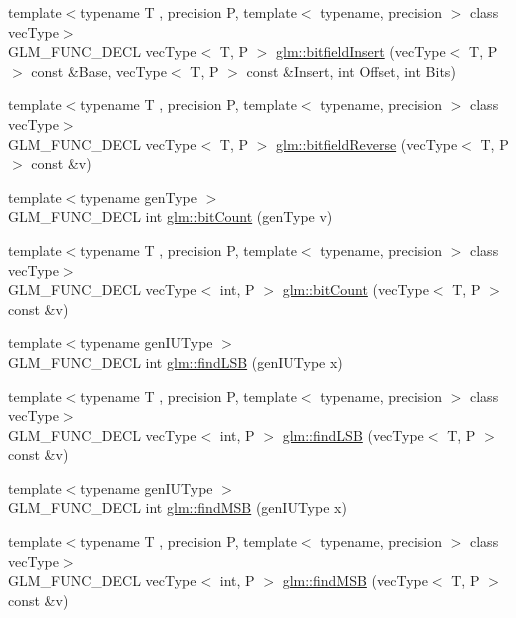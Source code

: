 \begin{DoxyCompactItemize}
\item 
{\footnotesize template$<$typename T , precision P, template$<$ typename, precision $>$ class vec\-Type$>$ }\\G\-L\-M\-\_\-\-F\-U\-N\-C\-\_\-\-D\-E\-C\-L vec\-Type$<$ T, P $>$ \hyperlink{group__core__func__integer_ga5681dfac9239beb1b8bd995e3c6496d7}{glm\-::bitfield\-Insert} (vec\-Type$<$ T, P $>$ const \&Base, vec\-Type$<$ T, P $>$ const \&Insert, int Offset, int Bits)
\item 
{\footnotesize template$<$typename T , precision P, template$<$ typename, precision $>$ class vec\-Type$>$ }\\G\-L\-M\-\_\-\-F\-U\-N\-C\-\_\-\-D\-E\-C\-L vec\-Type$<$ T, P $>$ \hyperlink{group__core__func__integer_ga153e7e8d0c035f83cce50fc3e580930f}{glm\-::bitfield\-Reverse} (vec\-Type$<$ T, P $>$ const \&v)
\item 
{\footnotesize template$<$typename gen\-Type $>$ }\\G\-L\-M\-\_\-\-F\-U\-N\-C\-\_\-\-D\-E\-C\-L int \hyperlink{group__core__func__integer_ga44abfe3379e11cbd29425a843420d0d6}{glm\-::bit\-Count} (gen\-Type v)
\item 
{\footnotesize template$<$typename T , precision P, template$<$ typename, precision $>$ class vec\-Type$>$ }\\G\-L\-M\-\_\-\-F\-U\-N\-C\-\_\-\-D\-E\-C\-L vec\-Type$<$ int, P $>$ \hyperlink{group__core__func__integer_ga1f29640969a3c54564da06ac67a5392e}{glm\-::bit\-Count} (vec\-Type$<$ T, P $>$ const \&v)
\item 
{\footnotesize template$<$typename gen\-I\-U\-Type $>$ }\\G\-L\-M\-\_\-\-F\-U\-N\-C\-\_\-\-D\-E\-C\-L int \hyperlink{group__core__func__integer_gaf74c4d969fa34ab8acb9d390f5ca5274}{glm\-::find\-L\-S\-B} (gen\-I\-U\-Type x)
\item 
{\footnotesize template$<$typename T , precision P, template$<$ typename, precision $>$ class vec\-Type$>$ }\\G\-L\-M\-\_\-\-F\-U\-N\-C\-\_\-\-D\-E\-C\-L vec\-Type$<$ int, P $>$ \hyperlink{group__core__func__integer_ga014a72009e68233c34c06a6dc2251b8c}{glm\-::find\-L\-S\-B} (vec\-Type$<$ T, P $>$ const \&v)
\item 
{\footnotesize template$<$typename gen\-I\-U\-Type $>$ }\\G\-L\-M\-\_\-\-F\-U\-N\-C\-\_\-\-D\-E\-C\-L int \hyperlink{group__core__func__integer_ga7e4a794d766861c70bc961630f8ef621}{glm\-::find\-M\-S\-B} (gen\-I\-U\-Type x)
\item 
{\footnotesize template$<$typename T , precision P, template$<$ typename, precision $>$ class vec\-Type$>$ }\\G\-L\-M\-\_\-\-F\-U\-N\-C\-\_\-\-D\-E\-C\-L vec\-Type$<$ int, P $>$ \hyperlink{group__core__func__integer_ga433104d77ec2ba58888aaefb77e9183f}{glm\-::find\-M\-S\-B} (vec\-Type$<$ T, P $>$ const \&v)
\end{DoxyCompactItemize}


